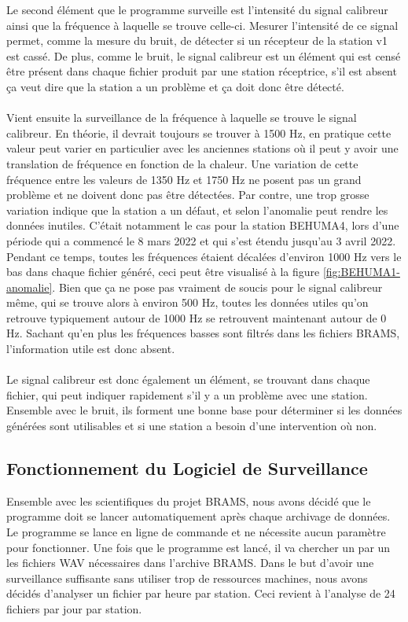 \documentclass[11pt]{article}
\begin{document}
Le second élément que le programme surveille est l'intensité du signal calibreur ainsi que la fréquence à laquelle se trouve celle-ci.
Mesurer l'intensité de ce signal permet, comme la mesure du bruit, de détecter si un récepteur de la station v1 est cassé.
De plus, comme le bruit, le signal calibreur est un élément qui est censé être présent dans chaque fichier produit par une station réceptrice, s'il est absent ça veut dire que la station a un problème et ça doit donc être détecté.\\
\\
Vient ensuite la surveillance de la fréquence à laquelle se trouve le signal calibreur.
En théorie, il devrait toujours se trouver à 1500 Hz, en pratique cette valeur peut varier en particulier avec les anciennes stations où il peut y avoir une translation de fréquence en fonction de la chaleur.
Une variation de cette fréquence entre les valeurs de 1350 Hz et 1750 Hz ne posent pas un grand problème et ne doivent donc pas être détectées.
Par contre, une trop grosse variation indique que la station a un défaut, et selon l'anomalie peut rendre les données inutiles.
C'était notamment le cas pour la station BEHUMA4, lors d'une période qui a commencé le 8 mars 2022 et qui s'est étendu jusqu'au 3 avril 2022.
Pendant ce temps, toutes les fréquences étaient décalées d'environ 1000 Hz vers le bas dans chaque fichier généré, ceci peut être visualisé à la figure \ref{fig:BEHUMA1-anomalie}.
Bien que ça ne pose pas vraiment de soucis pour le signal calibreur même, qui se trouve alors à environ 500 Hz, toutes les données utiles qu'on retrouve typiquement autour de 1000 Hz se retrouvent maintenant autour de 0 Hz.
Sachant qu'en plus les fréquences basses sont filtrés dans les fichiers BRAMS, l'information utile est donc absent.\\
\\
Le signal calibreur est donc également un élément, se trouvant dans chaque fichier, qui peut indiquer rapidement s'il y a un problème avec une station.
Ensemble avec le bruit, ils forment une bonne base pour déterminer si les données générées sont utilisables et si une station a besoin d'une intervention où non.

\subsection{Fonctionnement du Logiciel de Surveillance}

Ensemble avec les scientifiques du projet BRAMS, nous avons décidé que le programme doit se lancer automatiquement après chaque archivage de données.
Le programme se lance en ligne de commande et ne nécessite aucun paramètre pour fonctionner.
Une fois que le programme est lancé, il va chercher un par un les fichiers WAV nécessaires dans l'archive BRAMS.
Dans le but d'avoir une surveillance suffisante sans utiliser trop de ressources machines, nous avons décidés d'analyser un fichier par heure par station.
Ceci revient à l'analyse de 24 fichiers par jour par station.
\end{document}
